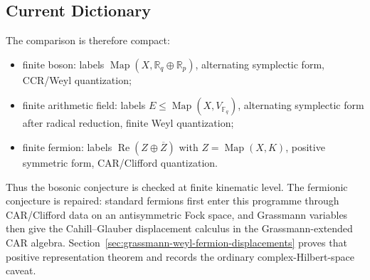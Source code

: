 \subsection{Current Dictionary}

The comparison is therefore compact:
\begin{itemize}
  \item finite boson: labels \(\operatorname{Map}(X,\mathbb R_q\oplus\mathbb R_p)\),
  alternating symplectic form, CCR/Weyl quantization;
  \item finite arithmetic field: labels \(E\leq\operatorname{Map}(X,V_{\mathbb F_q})\),
  alternating symplectic form after radical reduction, finite Weyl quantization;
  \item finite fermion: labels \(\operatorname{Re}(Z\oplus\overline Z)\) with
  \(Z=\operatorname{Map}(X,K)\), positive symmetric form, CAR/Clifford
  quantization.
\end{itemize}
Thus the bosonic conjecture is checked at finite kinematic level.  The
fermionic conjecture is repaired: standard fermions first enter this programme
through CAR/Clifford data on an antisymmetric Fock space, and Grassmann
variables then give the Cahill--Glauber displacement calculus in the
Grassmann-extended CAR algebra.  Section~\ref{sec:grassmann-weyl-fermion-displacements}
proves that positive
representation theorem and records the ordinary complex-Hilbert-space caveat.
